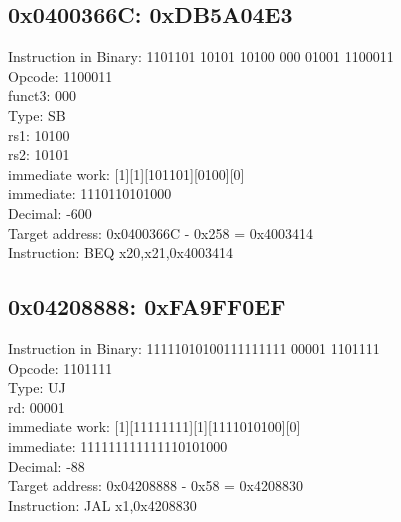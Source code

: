 \documentclass{article}
\begin{document}
\subsection*{0x0400366C: 0xDB5A04E3}

Instruction in Binary: 1101101 10101 10100 000 01001 1100011\\
Opcode: 1100011\\
funct3: 000\\
Type: SB\\
rs1: 10100\\
rs2: 10101\\
immediate work: [1][1][101101][0100][0]\\
immediate: 1110110101000\\
Decimal: -600\\
Target address: 0x0400366C - 0x258 = 0x4003414\\
Instruction: BEQ x20,x21,0x4003414\\

\subsection*{0x04208888: 0xFA9FF0EF}

Instruction in Binary: 11111010100111111111 00001 1101111\\
Opcode: 1101111\\
Type: UJ\\
rd: 00001\\
immediate work: [1][11111111][1][1111010100][0]\\
immediate: 111111111111110101000\\
Decimal: -88\\
Target address: 0x04208888 - 0x58 = 0x4208830\\
Instruction: JAL x1,0x4208830\\
\end{document}

